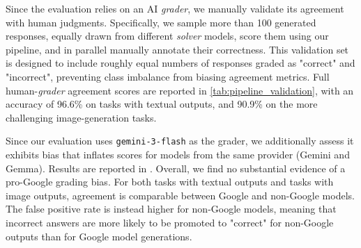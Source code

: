 


Since the evaluation relies on an AI \textit{grader}, we manually validate its agreement with human judgments.
Specifically, we sample more than 100 generated responses, equally drawn from different \textit{solver} models, score them using our pipeline, and in parallel manually annotate their correctness. This validation set is designed to include roughly equal numbers of responses graded as "correct" and "incorrect", preventing class imbalance from biasing agreement metrics. Full human-\textit{grader} agreement scores are reported in \autoref{tab:pipeline_validation}, with an accuracy of 96.6\% on tasks with textual outputs, and 90.9\% on the more challenging image-generation tasks.

Since our evaluation uses \texttt{gemini-3-flash} as the grader, we additionally assess it exhibits bias that inflates scores for models from the same provider (Gemini and Gemma). Results are reported in . Overall, we find no substantial evidence of a pro-Google grading bias. For both tasks with textual outputs and tasks with image outputs, agreement is comparable between Google and non-Google models. The false positive rate is instead higher for non-Google models, meaning that incorrect answers are more likely to be promoted to "correct" for non-Google outputs than for Google model generations.



